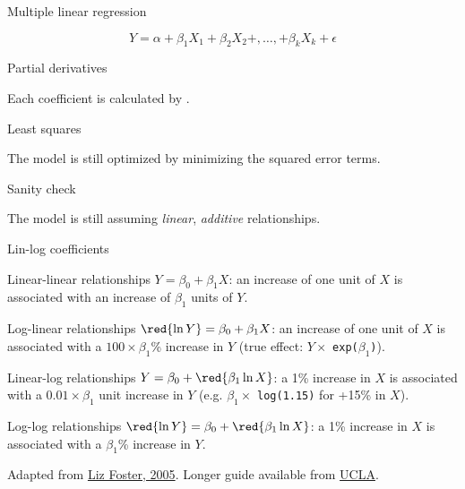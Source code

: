 \documentclass[t]{beamer}
\begin{document}
	\begin{frame}[c]{Multiple linear regression}
		
		$$Y = \alpha+\beta_1 X_1+\beta_2 X_2+,\ldots,+\beta_k X_k+\epsilon$$
		
		\vfill
		 
		\begin{block}{Partial derivatives}

			Each coefficient is calculated by .

		\end{block}

		\begin{block}{Least squares}

			The model is still optimized by minimizing the squared error terms.

		\end{block}

		\begin{alertblock}{Sanity check}

			The model is still assuming \emph{linear}, \emph{additive} relationships.

		\end{alertblock}
				
	\end{frame}


	\begin{frame}[c]{Lin-log coefficients}
	
	\begin{block}{Linear-linear relationships}
		$Y = \beta_0 + \beta_1 X$: an increase of one unit of $X$ is associated with an increase of $\beta_1$ units of $Y$.
	\end{block}
	
	\begin{block}{Log-linear relationships}
		$\red{\ln Y} = \beta_0 + \beta_1 X$: an increase of one unit of $X$ is associated with a $100 \times \beta_1$\% increase in $Y$ (true effect: $Y \times$ \texttt{exp($\beta_1$)}).
	\end{block}

	\begin{block}{Linear-log relationships}
		$Y = \beta_0 + \red{\beta_1 \ln X}$: a 1\% increase in $X$ is associated with a $0.01 \times \beta_1$ unit increase in $Y$ (e.g. $\beta_1 \times$ \texttt{log(1.15)} for +15\% in $X$).
	\end{block}
	
	\begin{block}{Log-log relationships}
		$\red{\ln Y} = \beta_0 + \red{\beta_1 \ln X}$: a 1\% increase in $X$ is associated with a $\beta_1$\%
		increase in $Y$.
	\end{block}
	
		Adapted from \href{https://www.princeton.edu/wwac/academic-review/stata/507c/stata_guide.pdf}{Liz Foster, 2005}. Longer guide available from \href{http://www.ats.ucla.edu/stat/mult_pkg/faq/general/log_transformed_regression.htm}{UCLA}.
	\end{frame}
	
\end{document}
